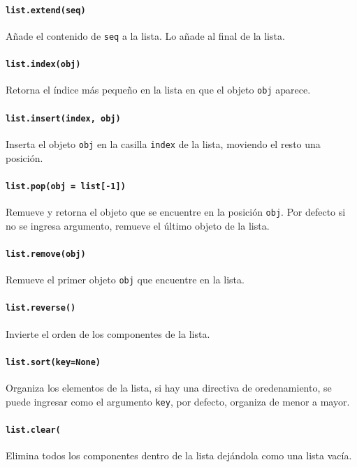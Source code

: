 \paragraph{\texttt{list.extend(seq)}} Añade el contenido de \texttt{seq} a la lista. Lo añade al final de la lista.

\paragraph{\texttt{list.index(obj)}} Retorna el índice más pequeño en la lista en que el objeto \texttt{obj} aparece.

\paragraph{\texttt{list.insert(index, obj)}} Inserta el objeto \texttt{obj} en la casilla \texttt{index} de la lista, moviendo el resto una posición.

\paragraph{\texttt{list.pop(obj = list[-1])}} Remueve y retorna el objeto que se encuentre en la posición \texttt{obj}. Por defecto si no se ingresa argumento, remueve el último objeto de la lista.

\paragraph{\texttt{list.remove(obj)}} Remueve el primer objeto \texttt{obj} que encuentre en la lista.

\paragraph{\texttt{list.reverse()}} Invierte el orden de los componentes de la lista.

\paragraph{\texttt{list.sort(key=None)}} Organiza los elementos de la lista, si hay una directiva de oredenamiento, se puede ingresar como el argumento \texttt{key}, por defecto, organiza de menor a mayor.

\paragraph{\texttt{list.clear(}} Elimina todos los componentes dentro de la lista dejándola como una lista vacía.

